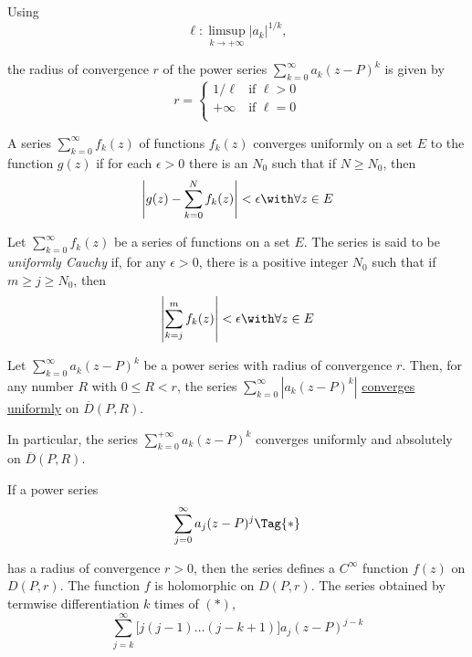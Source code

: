 \label{a9ba20f}

Using
$$
  \ell:\limsup_{k\to+\infty}|a_k|^{1/k},
$$

the radius of convergence $r$ of the power series $\sum_{k=0}^\infty
a_k(z-P)^k$ is given by
\begin{equation*}
  r=\begin{cases}
    1/\ell  & \text{if } \ell>0 \\
    +\infty & \text{if } \ell=0 \\
  \end{cases}
\end{equation*}

\label{bba67e4}

A series $\sum_{k=0}^\infty f_k(z)$ of functions $f_k(z)$ converges uniformly
on a set $E$ to the function $g(z)$ if for each $\epsilon>0$ there is an $N_0$
such that if $N\geq N_0$, then
$$
  \left|g(z)-\sum_{k=0}^N f_k(z)\right|<\epsilon\with\forall z\in E
$$

\label{bfe260e}

Let $\sum_{k=0}^\infty f_k(z)$ be a series of functions on a set $E$. The
series is said to be \textit{uniformly Cauchy} if, for any $\epsilon>0$, there
is a positive integer $N_0$ such that if $m\geq j\geq N_0$, then
$$
  \left|\sum_{k=j}^mf_k(z)\right|<\epsilon\with\forall z\in E
$$

\label{ec076c1}

Let $\sum_{k=0}^\infty a_k(z-P)^k$ be a power series with radius of convergence
$r$. Then, for any number $R$ with $0\leq R<r$, the series
$\sum_{k=0}^\infty|a_k(z-P)^k|$ \href{bba67e4}{converges uniformly} on
$\overline D(P,R)$.

In particular, the series $\sum_{k=0}^{+\infty}a_k(z-P)^k$ converges uniformly
and absolutely on $\overline D(P,R)$.

\label{ccf2595}

If a power series
\begin{equation*}
  \sum_{j=0}^\infty a_j(z-P)^j\Tag{*}
\end{equation*}

has a radius of convergence $r>0$, then the series defines a $C^\infty$
function $f(z)$ on $D(P,r)$. The function $f$ is holomorphic on $D(P,r)$. The
series obtained by termwise differentiation $k$ times of $(*)$,
$$
  \sum_{j=k}^\infty\Big[j(j-1)\ldots(j-k+1)\Big]a_j(z-P)^{j-k}
$$

